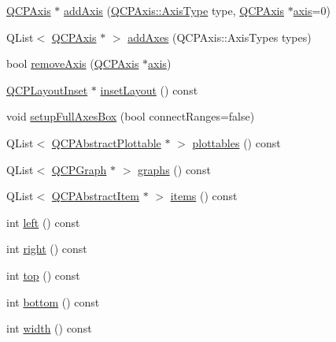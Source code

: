 \begin{DoxyCompactItemize}
\item 
\hyperlink{class_q_c_p_axis}{Q\+C\+P\+Axis} $\ast$ \hyperlink{class_q_c_p_axis_rect_a2dc336092ccc57d44a46194c8a23e4f4}{add\+Axis} (\hyperlink{class_q_c_p_axis_ae2bcc1728b382f10f064612b368bc18a}{Q\+C\+P\+Axis\+::\+Axis\+Type} type, \hyperlink{class_q_c_p_axis}{Q\+C\+P\+Axis} $\ast$\hyperlink{class_q_c_p_axis_rect_a583ae4f6d78b601b732183f6cabecbe1}{axis}=0)
\item 
Q\+List$<$ \hyperlink{class_q_c_p_axis}{Q\+C\+P\+Axis} $\ast$ $>$ \hyperlink{class_q_c_p_axis_rect_a792e1f3d9cb1591fca135bb0de9b81fc}{add\+Axes} (Q\+C\+P\+Axis\+::\+Axis\+Types types)
\item 
bool \hyperlink{class_q_c_p_axis_rect_a03c39cd9704f0d36fb6cf980cdddcbaa}{remove\+Axis} (\hyperlink{class_q_c_p_axis}{Q\+C\+P\+Axis} $\ast$\hyperlink{class_q_c_p_axis_rect_a583ae4f6d78b601b732183f6cabecbe1}{axis})
\item 
\hyperlink{class_q_c_p_layout_inset}{Q\+C\+P\+Layout\+Inset} $\ast$ \hyperlink{class_q_c_p_axis_rect_a949f803466619924c7018df4b511ae10}{inset\+Layout} () const
\item 
void \hyperlink{class_q_c_p_axis_rect_a5fa906175447b14206954f77fc7f1ef4}{setup\+Full\+Axes\+Box} (bool connect\+Ranges=false)
\item 
Q\+List$<$ \hyperlink{class_q_c_p_abstract_plottable}{Q\+C\+P\+Abstract\+Plottable} $\ast$ $>$ \hyperlink{class_q_c_p_axis_rect_a587d073a97b27bc7293fab4b2774ad59}{plottables} () const
\item 
Q\+List$<$ \hyperlink{class_q_c_p_graph}{Q\+C\+P\+Graph} $\ast$ $>$ \hyperlink{class_q_c_p_axis_rect_a2d9ded3eca97be1fcb5867949391bb88}{graphs} () const
\item 
Q\+List$<$ \hyperlink{class_q_c_p_abstract_item}{Q\+C\+P\+Abstract\+Item} $\ast$ $>$ \hyperlink{class_q_c_p_axis_rect_a03c113a2175448300ee8f944e24776ba}{items} () const
\item 
int \hyperlink{class_q_c_p_axis_rect_afb4a3de02046b20b9310bdb8fca781c3}{left} () const
\item 
int \hyperlink{class_q_c_p_axis_rect_a3f819d4a1b2193723d1fdafc573eea10}{right} () const
\item 
int \hyperlink{class_q_c_p_axis_rect_a45dbad181cbb9f09d068dbb76c817c95}{top} () const
\item 
int \hyperlink{class_q_c_p_axis_rect_acefdf1abaa8a8ab681e906cc2be9581e}{bottom} () const
\item 
int \hyperlink{class_q_c_p_axis_rect_a204645398a4f9d0b0189385c7c2cfb91}{width} () const
\item 

\end{DoxyCompactItemize}
